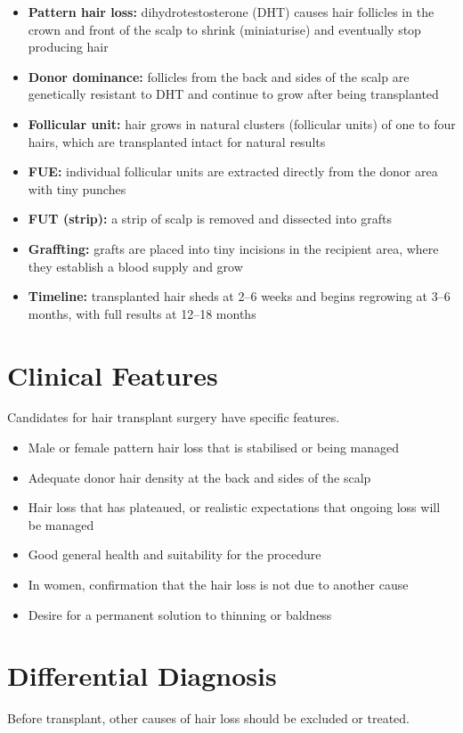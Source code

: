 \begin{itemize}
    \item \textbf{Pattern hair loss:} dihydrotestosterone (DHT) causes hair follicles in the crown and front of the scalp to shrink (miniaturise) and eventually stop producing hair
    \item \textbf{Donor dominance:} follicles from the back and sides of the scalp are genetically resistant to DHT and continue to grow after being transplanted
    \item \textbf{Follicular unit:} hair grows in natural clusters (follicular units) of one to four hairs, which are transplanted intact for natural results
    \item \textbf{FUE:} individual follicular units are extracted directly from the donor area with tiny punches
    \item \textbf{FUT (strip):} a strip of scalp is removed and dissected into grafts
    \item \textbf{Graffting:} grafts are placed into tiny incisions in the recipient area, where they establish a blood supply and grow
    \item \textbf{Timeline:} transplanted hair sheds at 2--6 weeks and begins regrowing at 3--6 months, with full results at 12--18 months
\end{itemize}

\section*{Clinical Features}
Candidates for hair transplant surgery have specific features.

\begin{itemize}
    \item Male or female pattern hair loss that is stabilised or being managed
    \item Adequate donor hair density at the back and sides of the scalp
    \item Hair loss that has plateaued, or realistic expectations that ongoing loss will be managed
    \item Good general health and suitability for the procedure
    \item In women, confirmation that the hair loss is not due to another cause
    \item Desire for a permanent solution to thinning or baldness
\end{itemize}

\section*{Differential Diagnosis}
Before transplant, other causes of hair loss should be excluded or treated.

